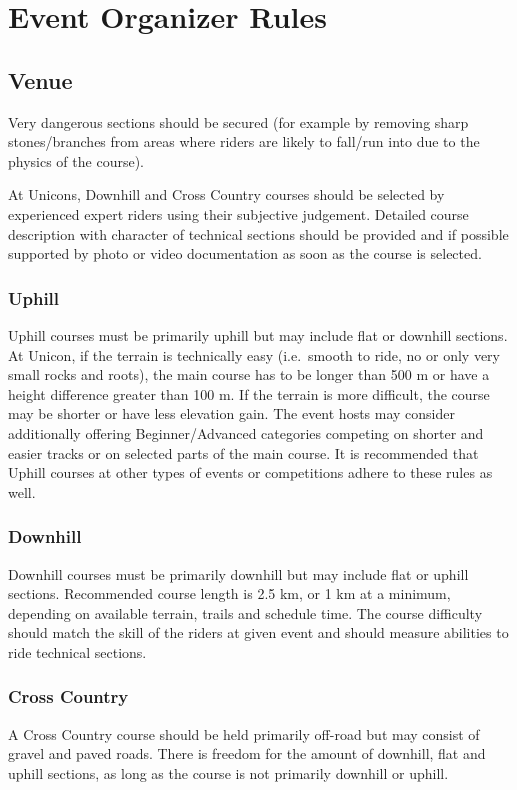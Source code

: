 \chapter{Event Organizer Rules}

\section{Venue}
Very dangerous sections should be secured (for example by removing sharp stones/branches from areas where riders are likely to fall/run into due to the physics of the course).

At Unicons, Downhill and Cross Country courses should be selected by experienced expert riders using their subjective judgement.
Detailed course description with character of technical sections should be provided and if possible supported by photo or video documentation as soon as the course is selected. 

\subsection{Uphill}
Uphill courses must be primarily uphill but may include flat or downhill sections.
At Unicon, if the terrain is technically easy (i.e.\ smooth to ride, no or only very small rocks and roots), the main course has to be longer than 500 m or have a height difference greater than 100 m.
If the terrain is more difficult, the course may be shorter or have less elevation gain.
The event hosts may consider additionally offering Beginner/Advanced categories competing on shorter and easier tracks or on selected parts of the main course.
It is recommended that Uphill courses at other types of events or competitions adhere to these rules as well.

\subsection{Downhill}
Downhill courses must be primarily downhill but may include flat or uphill sections.
Recommended course length is 2.5 km, or 1 km at a minimum, depending on available terrain, trails and schedule time.
The course difficulty should match the skill of the riders at given event and should measure abilities to ride technical sections.

\subsection{Cross Country}
A Cross Country course should be held primarily off-road but may consist of gravel and paved roads.
There is freedom for the amount of downhill, flat and uphill sections, as long as the course is not primarily downhill or uphill.

